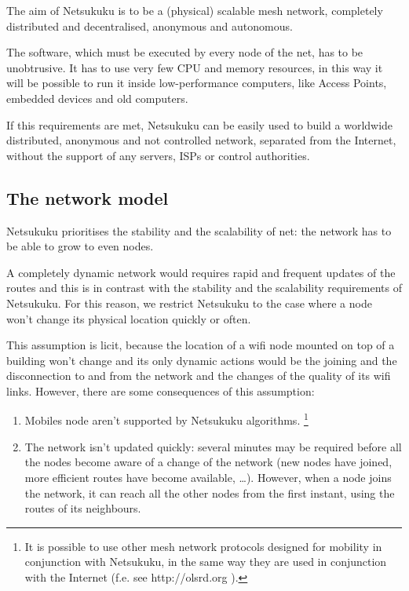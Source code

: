 \documentclass[a4paper]{article}
\newcommand{\href}[2]{ #1 }
\begin{document}
The aim of Netsukuku is to be a (physical) scalable mesh network, completely
distributed and decentralised, anonymous and autonomous.

The software, which must be executed by every node of the net, has to be
unobtrusive. It has to use very few CPU and memory resources, in this way it
will be possible to run it inside low-performance computers, like Access Points,
embedded devices and old computers.

If this requirements are met, Netsukuku can be easily used to build a worldwide
distributed, anonymous and not controlled network, separated from the
Internet, without the support of any servers, ISPs or control authorities.

\subsection{The network model}
\label{sec:net_model}

Netsukuku prioritises the stability and the scalability of net: the network
has to be able to grow to even  nodes.

A completely dynamic network would requires rapid and frequent updates
of the routes and this is in contrast with the stability and the scalability
requirements of Netsukuku.
For this reason, we restrict Netsukuku to the case where a node won't change
its physical location quickly or often.

This assumption is licit, because the location of a wifi node mounted on
top of a building won't change and its only dynamic actions would be the
joining and the disconnection to and from the network and the changes of the
quality of its wifi links.
However, there are some consequences of this assumption:
\begin{enumerate}
	\item	Mobiles node aren't supported by Netsukuku algorithms.
		\footnote{It is possible to use other mesh network protocols
		designed for mobility in conjunction with Netsukuku, in the
		same way they are used in conjunction
		with the Internet (f.e. see \href{http://olsrd.org}{olsrd}). }
	\item   The network isn't updated quickly: several minutes may be
		required before all the nodes become aware of a change of the
		network (new nodes have joined, more efficient routes have
		become available, \dots). However, when a node joins
		the network, it can reach all the other nodes from the first
		instant, using the routes of its neighbours.
\end{enumerate}
\end{document}
